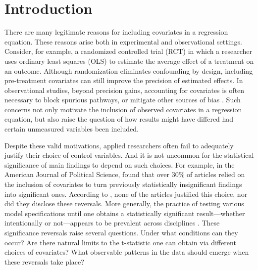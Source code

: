 \documentclass[sts]{imsart}
\theoremstyle{plain}
\theoremstyle{definition}
\begin{document}
\section{Introduction}

There are many legitimate reasons for including covariates in a regression equation. These reasons arise both in experimental and observational settings. Consider, for example, a randomized controlled trial (RCT) in which a researcher uses ordinary least squares (OLS) to estimate the average effect of a treatment on an outcome. Although randomization eliminates confounding by design, including pre-treatment covariates can still improve the precision of estimated effects. In observational studies, beyond precision gains, accounting for covariates is often necessary to block spurious pathways, or mitigate other sources of bias \citep{cinelli2022crash}. Such concerns not only motivate the inclusion of observed covariates in a regression equation, but also raise the question of how results might have differed had certain unmeasured variables been included.

Despite these valid motivations, applied researchers often fail to adequately justify their choice of control variables. And it is not uncommon for the statistical significance of main findings to depend on such choices. For example, in the American Journal of Political Science, \cite{lenz2021achieving} found that over 30\% of articles relied on the inclusion of covariates to turn previously statistically insignificant findings into significant ones.  According to \cite{lenz2021achieving}, none of the articles justified this choice, nor did they disclose these reversals. More generally, the practice of testing various model specifications until one obtains a statistically significant result---whether intentionally or not---appears to be prevalent across disciplines \citep{brodeur2016star,vivalt2019specification}.  These significance reversals raise several questions. Under what conditions can they occur? Are there natural limits to the t-statistic one can obtain via different choices of covariates? What observable patterns in the data should emerge when these reversals take place?
\end{document}
